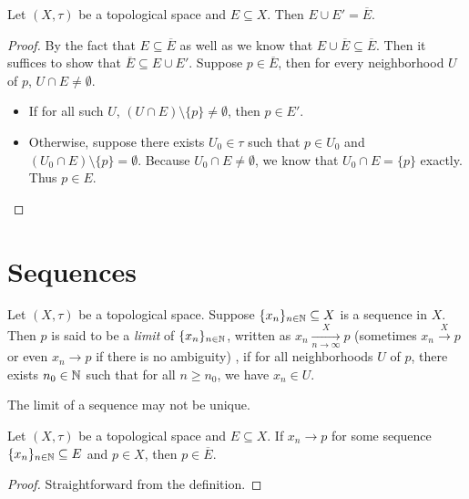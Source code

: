 \documentclass[screen]{techreport}
\numberwithin{equation}{section}
\begin{document}
\begin{proposition}\label{Prop:OrigPlusLimitIsClosure}
	Let $(X,\tau)$ be a topological space and $E \subseteq X$.
	Then $E \cup E' = \overline{E}$.
\end{proposition}
\begin{proof}
	By the fact that $E \subseteq \overline{E}$ as well as  we know that $E \cup \overline{E} \subseteq \overline{E}$.
	Then it suffices to show that $\overline{E} \subseteq E \cup E'$.
	Suppose $p \in \overline{E}$, then for every neighborhood $U$ of $p$, $U \cap E \neq \emptyset$.
	\begin{itemize}
		\item If for all such $U$, $(U \cap E) \setminus \{p\} \neq \emptyset$, then $p \in E'$.
		\item Otherwise, suppose there exists $U_0 \in \tau$ such that $p \in U_0$ and $(U_0 \cap E) \setminus \{p\} = \emptyset$. Because $U_0 \cap E \neq \emptyset$, we know that $U_0 \cap E = \{ p\}$ exactly. Thus $p \in E$.
	\end{itemize}
\end{proof}

\section{Sequences}

\begin{definition}\label{De:Sequences}
	Let $(X,\tau)$ be a topological space.
	Suppose $\{x_n\}_{n \in \mathbb{N}} \subseteq X$ is a sequence in $X$.
	Then $p$ is said to be a \emph{limit} of $\{x_n\}_{n \in \mathbb{N}}$, written as $x_n \xrightarrow[n \to \infty]{X} p$ (sometimes $x_n \xrightarrow{X} p$ or even $x_n \rightarrow p$ if there is no ambiguity) , if for all neighborhoods $U$ of $p$, there exists $n_0 \in \mathbb{N}$ such that for all $n \ge n_0$, we have $x_n \in U$.
\end{definition}

\begin{remark}\label{Rem:LimitOfSeqNotUnique}
	The limit of a sequence may not be unique.
\end{remark}

\begin{lemma}\label{Lem:LimitOfSeqInClosure}
	Let $(X,\tau)$ be a topological space and $E \subseteq X$.
	If $x_n \rightarrow p$ for some sequence $\{x_n\}_{n \in \mathbb{N}} \subseteq E$ and $p \in X$, then $p \in \overline{E}$.
\end{lemma}
\begin{proof}
	Straightforward from the definition.
\end{proof}
\end{document}
